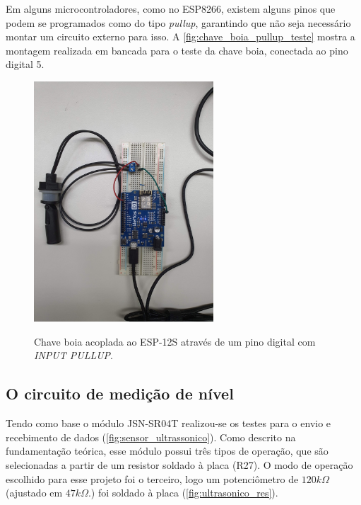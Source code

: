  Em alguns microcontroladores, como no ESP8266, existem alguns pinos que podem se programados como do tipo \textit{pullup}, garantindo que não seja necessário montar um circuito externo para isso. A \autoref{fig:chave_boia_pullup_teste} mostra a montagem realizada em bancada para o teste da chave boia, conectada ao pino digital 5. 
 
 \begin{figure}[H]
 	\centering
 	\caption{Chave boia acoplada ao ESP-12S através de um pino digital com \textit{INPUT PULLUP}.}
 	\includegraphics[width=0.6\textwidth]{figuras/teste_chave_boia.jpg}
 	\label{fig:chave_boia_pullup_teste}
 \end{figure}
 



\subsection{O circuito de medição de nível}

Tendo como base o módulo JSN-SR04T realizou-se os testes para o envio e recebimento de dados (\autoref{fig:sensor_ultrassonico}). Como descrito na fundamentação teórica, esse módulo possui três tipos de operação, que são selecionadas a partir de um resistor soldado à placa (R27). O modo de operação escolhido para esse projeto foi o terceiro, logo um potenciômetro de $120k\Omega$ (ajustado em $47k\Omega$.) foi soldado à placa (\autoref{fig:ultrasonico_res}). 

